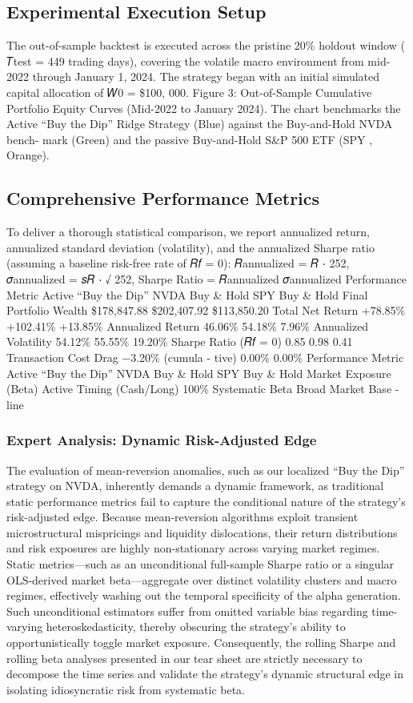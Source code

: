 \documentclass[12pt, a4paper]{article}
\begin{document}
{\subsection{Experimental Execution Setup}
The out-of-sample backtest is executed across the pristine 20\% holdout window ( 𝑇test = 449 trading 
days), covering the volatile macro environment from mid-2022 through January 1, 2024. The strategy 
began with an initial simulated capital allocation of 𝑊0 = \$100, 000.
Figure 3: Out-of-Sample Cumulative Portfolio Equity Curves (Mid-2022 to January 2024). The chart 
benchmarks the Active ``Buy the Dip'' Ridge Strategy (Blue) against the Buy-and-Hold NVDA bench-
mark (Green) and the passive Buy-and-Hold S\&P 500 ETF (SPY , Orange).

\subsection{Comprehensive Performance Metrics}
To deliver a thorough statistical comparison, we report annualized return, annualized standard deviation 
(volatility), and the annualized Sharpe ratio (assuming a baseline risk-free rate of 𝑅𝑓 = 0):
𝑅annualized = 𝑅 ⋅ 252, 𝜎annualized = 𝑠𝑅 ⋅
√
252, Sharpe Ratio = 𝑅annualized
𝜎annualized
Performance Metric Active ``Buy the 
Dip''
NVDA Buy \& Hold SPY Buy \& Hold
Final Portfolio Wealth \$178,847.88 \$202,407.92 \$113,850.20
Total Net Return +78.85\% +102.41\% +13.85\%
Annualized Return 46.06\% 54.18\% 7.96\%
Annualized Volatility 54.12\% 55.55\% 19.20\%
Sharpe Ratio (𝑅𝑓 = 0) 0.85 0.98 0.41
Transaction Cost Drag −3.20\% (cumula -
tive)
0.00\% 0.00\%
Performance Metric Active ``Buy the 
Dip''
NVDA Buy \& Hold SPY Buy \& Hold
Market Exposure (Beta) Active Timing 
(Cash/Long)
100\% Systematic 
Beta
Broad Market Base -
line


\subsubsection*{Expert Analysis: Dynamic Risk-Adjusted Edge}
The evaluation of mean-reversion anomalies, such as our localized ``Buy the Dip'' strategy on NVDA, inherently demands a dynamic framework, as traditional static performance metrics fail to capture the conditional nature of the strategy's risk-adjusted edge. Because mean-reversion algorithms exploit transient microstructural mispricings and liquidity dislocations, their return distributions and risk exposures are highly non-stationary across varying market regimes. Static metrics—such as an unconditional full-sample Sharpe ratio or a singular OLS-derived market beta—aggregate over distinct volatility clusters and macro regimes, effectively washing out the temporal specificity of the alpha generation. Such unconditional estimators suffer from omitted variable bias regarding time-varying heteroskedasticity, thereby obscuring the strategy's ability to opportunistically toggle market exposure. Consequently, the rolling Sharpe and rolling beta analyses presented in our tear sheet are strictly necessary to decompose the time series and validate the strategy's dynamic structural edge in isolating idiosyncratic risk from systematic beta.

}
\end{document}
